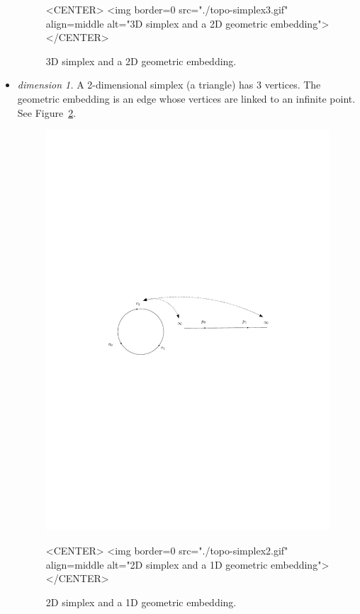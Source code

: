 \begin{itemize}
\begin{figure}
\begin{ccTexOnly}
\begin{center}
\end{center}
\end{ccTexOnly}
\begin{ccHtmlOnly}
<CENTER>
<img border=0 src="./topo-simplex3.gif" align=middle
alt="3D simplex and a 2D geometric embedding">
</CENTER>
\end{ccHtmlOnly}
\caption{3D simplex and a 2D geometric embedding.
\label{TDS3-fig-topo-simplex3}}
\end{figure} 
\item \emph{dimension 1.} A 2-dimensional simplex (a triangle) has 3
vertices. The geometric embedding is an edge whose vertices are linked
to an infinite point.  See Figure~\ref{TDS3-fig-topo-simplex2}.
\begin{figure}
\begin{ccTexOnly}
\begin{center} 
\includegraphics{TriangulationDS_3/topo-simplex2}
\end{center}
\end{ccTexOnly}
\begin{ccHtmlOnly}
<CENTER>
<img border=0 src="./topo-simplex2.gif" align=middle
alt="2D simplex and a 1D geometric embedding">
</CENTER>
\end{ccHtmlOnly}
\caption{2D simplex and a 1D geometric embedding.
\label{TDS3-fig-topo-simplex2}}
\end{figure} 
\end{itemize}

